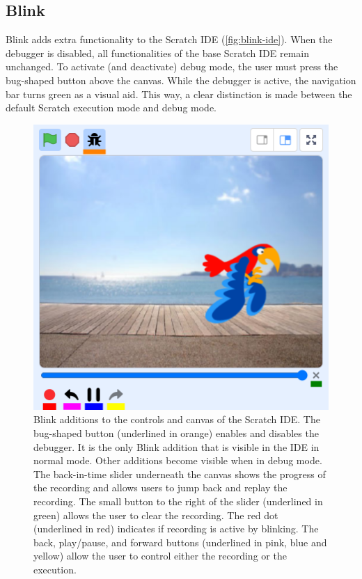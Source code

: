 \documentclass[../main]{subfiles}
\begin{document}
\subsection{Blink}\label{subsec:blink}

Blink adds extra functionality to the Scratch IDE (\vref{fig:blink-ide}).
When the debugger is disabled, all functionalities of the base Scratch IDE remain unchanged.
To activate (and deactivate) debug mode, the user must press the bug-shaped button above the canvas.
While the debugger is active, the navigation bar turns green as a visual aid.
This way, a clear distinction is made between the default Scratch execution mode and debug mode.

\begin{figure}
    \centering
    \includegraphics[width=\textwidth]{scratch-debugger-ide}
    \caption{
        Blink additions to the controls and canvas of the Scratch IDE.
        The bug-shaped button (underlined in orange) enables and disables the debugger.
        It is the only Blink addition that is visible in the IDE in normal mode.
        Other additions become visible when in debug mode.
        The back-in-time slider underneath the canvas shows the progress of the recording and allows users to jump back and replay the recording.
        The small button to the right of the slider (underlined in green) allows the user to clear the recording.
        The red dot (underlined in red) indicates if recording is active by blinking.
        The back, play/pause, and forward buttons (underlined in pink, blue and yellow) allow the user to control either the recording or the execution.
    }
    \label{fig:blink-ide}
\end{figure}
\end{document}
